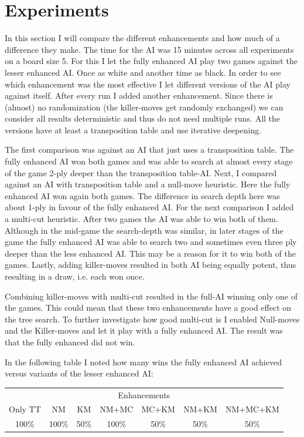 \documentclass[a4paper]{article}
\begin{document}
\section{Experiments}
In this section I will compare the different enhancements and how much of a difference they make. The time for the AI was 15 minutes across all experiments on a board size 5. For this I let the fully enhanced AI play two games against the lesser enhanced AI. Once as white and another time as black.
In order to see which enhancement was the most effective I let different versions of the AI play against itself. After every run I added another enhancement. Since there is (almost) no randomization (the killer-moves get randomly exchanged) we can consider all results deterministic and thus do not need multiple runs. All the versions have at least a transposition table and use iterative deepening.

The first comparison was against an AI that just uses a transposition table. The fully enhanced AI won both games and was able to search at almost every stage of the game 2-ply deeper than the transposition table-AI.
Next, I compared against an AI with transposition table and a null-move heuristic. Here the fully enhanced AI won again both games. The difference in search depth here was about 1-ply in favour of the fully enhanced AI.
For the next comparison I added a multi-cut heuristic. After two games the AI was able to win both of them. Although in the mid-game the search-depth was similar, in later stages of the game the fully enhanced AI was able to search two and sometimes even three ply deeper than the less enhanced AI. This may be a reason for it to win both of the games.
Lastly, adding killer-moves resulted in both AI being equally potent, thus resulting in a draw, i.e. each won once.

Combining killer-moves with multi-cut resulted in the full-AI winning only one of the games. This could mean that these two enhancements have a good effect on the tree search. To further investigate how good multi-cut is I enabled Null-moves and the Killer-moves and let it play with a fully enhanced AI. The result was that the fully enhanced did not win.

In the following table I noted how many wins the fully enhanced AI achieved versus variants of the lesser enhanced AI: \\
\begin{tabular}{c|c|c|c|c|c|c}
	\multicolumn{7}{c}{Enhancements} \\
	Only TT & NM & KM & NM+MC & MC+KM & NM+KM & NM+MC+KM \\
	\hline
	100\% & 100\% & 50\% & 100\% & 50\% & 50\% & 50\%

\end{tabular}



\end{document}
